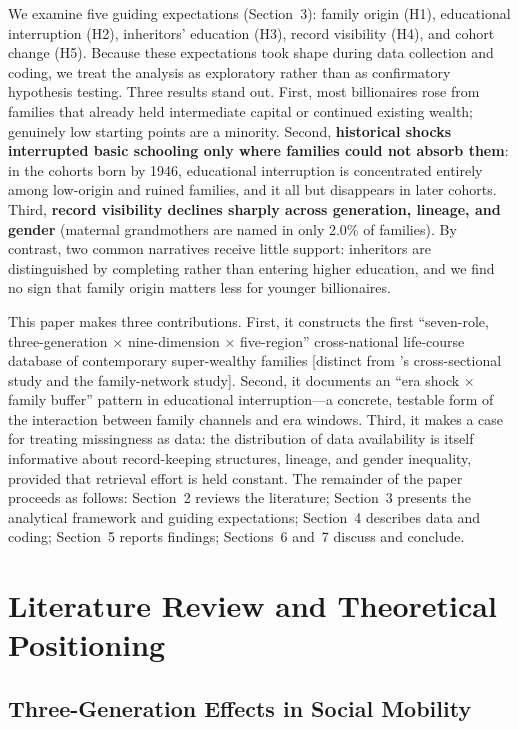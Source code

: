 \documentclass[11pt,a4paper]{article}
\begin{document}
We examine five guiding expectations (Section~3): family origin (H1), educational interruption (H2), inheritors' education (H3), record visibility (H4), and cohort change (H5). Because these expectations took shape during data collection and coding, we treat the analysis as exploratory rather than as confirmatory hypothesis testing. Three results stand out. First, most billionaires rose from families that already held intermediate capital or continued existing wealth; genuinely low starting points are a minority. Second, \textbf{historical shocks interrupted basic schooling only where families could not absorb them}: in the cohorts born by 1946, educational interruption is concentrated entirely among low-origin and ruined families, and it all but disappears in later cohorts. Third, \textbf{record visibility declines sharply across generation, lineage, and gender} (maternal grandmothers are named in only 2.0\% of families). By contrast, two common narratives receive little support: inheritors are distinguished by completing rather than entering higher education, and we find no sign that family origin matters less for younger billionaires.

This paper makes three contributions. First, it constructs the first ``seven-role, three-generation $\times$ nine-dimension $\times$ five-region'' cross-national life-course database of contemporary super-wealthy families [distinct from \citet{lillie2025}'s cross-sectional study and the \citet{familyweb2023} family-network study]. Second, it documents an ``era shock $\times$ family buffer'' pattern in educational interruption---a concrete, testable form of the interaction between family channels and era windows. Third, it makes a case for treating missingness as data: the distribution of data availability is itself informative about record-keeping structures, lineage, and gender inequality, provided that retrieval effort is held constant. The remainder of the paper proceeds as follows: Section~2 reviews the literature; Section~3 presents the analytical framework and guiding expectations; Section~4 describes data and coding; Section~5 reports findings; Sections~6 and~7 discuss and conclude.

\section{Literature Review and Theoretical Positioning}
\label{sec:lit}

\subsection{Three-Generation Effects in Social Mobility}
\end{document}
